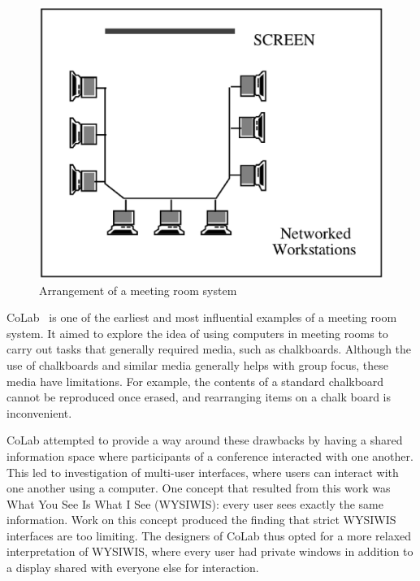 \begin{figure}[htp]
  \centering
  \includegraphics[scale=.47]{meeting_room_sys}
  \caption{Arrangement of a meeting room system\cite{journals/iwc/Rodden91}}
  \label{meeting_room_fig}
\end{figure}



CoLab~\cite{Stefik:1987:BCU} is one of the earliest and most
influential examples of a meeting room system. It aimed to explore the
idea of using computers in meeting rooms to carry out tasks that
generally required media, such as chalkboards. Although the use of
chalkboards and similar media generally helps with group focus, these
media have limitations.  For example, the contents of a standard
chalkboard cannot be reproduced once erased, and rearranging items on
a chalk board is inconvenient.

CoLab attempted to provide a way around these drawbacks by having a
shared information space where participants of a conference interacted
with one another. This led to investigation of multi-user interfaces,
where users can interact with one another using a computer.  One
concept that resulted from this work was What You See Is What I See
(WYSIWIS): every user sees exactly the same information.  Work on this
concept produced the finding that strict WYSIWIS interfaces are too
limiting.  The designers of CoLab thus opted for a more relaxed
interpretation of WYSIWIS, where every user had private windows in
addition to a display shared with everyone else for interaction.

